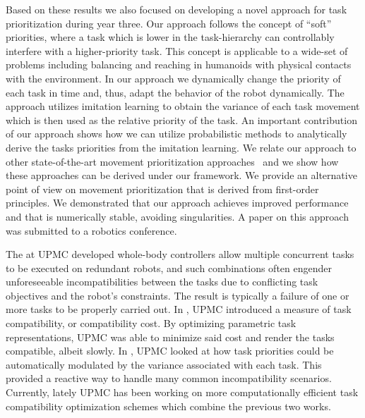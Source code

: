 Based on these results we also focused on developing a novel approach for task 
prioritization during year three. Our approach follows the concept of ``soft'' 
priorities, where a task which is lower in the task-hierarchy can controllably 
interfere with a higher-priority task. This concept is applicable to a wide-set 
of problems including balancing and reaching in humanoids with physical contacts 
with the environment. In our approach we dynamically change the priority of each 
task in time and, thus, adapt the behavior of the robot dynamically.  The 
approach utilizes imitation learning to obtain the variance of each task 
movement which is then used as the relative priority of the task. An important 
contribution of our approach shows how we can utilize probabilistic methods to 
analytically derive the tasks priorities from the imitation learning. We relate 
our approach to other state-of-the-art movement prioritization 
approaches~\cite{Peters_AR_2008, lober2015variance} and we show how these 
approaches can be derived under our framework. We provide an alternative point 
of view on movement prioritization that is derived from first-order principles. 
We demonstrated that our approach achieves improved performance and that is 
numerically stable, avoiding singularities. A paper on this approach was 
submitted to a robotics conference.

The at UPMC developed whole-body controllers allow multiple concurrent tasks to be 
executed on redundant robots, and such combinations often engender unforeseeable 
incompatibilities between the tasks due to conflicting task objectives and the 
robot's constraints. The result is typically a failure of one or more tasks to 
be properly carried out. In \cite{lober-HUMANOIDS2014}, UPMC introduced a measure of task 
compatibility, or compatibility cost. By optimizing parametric task 
representations, UPMC was able to minimize said cost and render the tasks 
compatible, albeit slowly. In \cite{lober2015variance}, UPMC looked at how task 
priorities could be automatically modulated by the variance associated with each 
task. This provided a reactive way to handle many common incompatibility 
scenarios. Currently, lately UPMC has been working on more computationally 
efficient task compatibility optimization schemes which combine the previous two 
works.   
